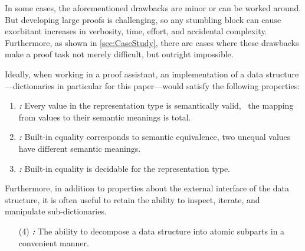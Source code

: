 In some cases, the aforementioned drawbacks are minor or can be worked around.
%
But developing large proofs is challenging, so any stumbling block can cause exorbitant increases in verbosity, time, effort, and accidental complexity.
%
Furthermore, as shown in \autoref{sec:CaseStudy}, there are cases where these drawbacks make a proof task not merely difficult, but outright impossible.


Ideally, when working in a proof assistant, an implementation of a data structure---dictionaries in particular for this paper---would satisfy the following properties:

\newcommand{\designGoal}[1]
  {\textbf{\emph{#1:}}}

\begin{enumerate}

\item
%
\designGoal{\SemTot}
%
Every value in the representation type is semantically valid, \ie{}~the mapping from values to their semantic meanings is total.

\item
%
\designGoal{\SemInj}
%
Built-in equality corresponds to semantic equivalence, \ie{} two unequal values have different semantic meanings.

\item
%
\designGoal{\EqDec}
%
Built-in equality is decidable for the representation type.

\end{enumerate}

Furthermore, in addition to properties about the external interface of the data structure, it is often useful to retain the ability to inspect, iterate, and manipulate sub-dictionaries.
%

\begin{enumerate}

\item[(4)]
%
\designGoal{\EzDstr}
%
The ability to decompose a data structure into atomic subparts in a convenient manner.



\end{enumerate}



